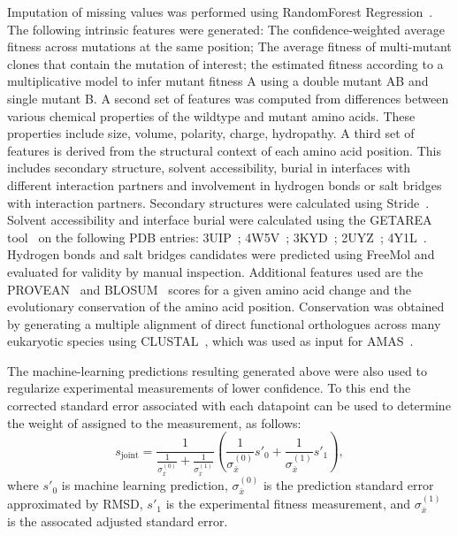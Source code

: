 Imputation of missing values was performed using RandomForest Regression~\cite{breiman_random_2001}. The following intrinsic features were generated: The confidence-weighted average fitness across mutations at the same position; The average fitness of multi-mutant clones that contain the mutation of interest; the estimated fitness according to a multiplicative model to infer mutant fitness A using a double mutant AB and single mutant B.
A second set of features was computed from differences between various chemical properties of the wildtype and mutant amino acids. These properties include size, volume, polarity, charge, hydropathy.
A third set of features is derived from the structural context of each amino acid position. This includes secondary structure, solvent accessibility, burial in interfaces with different interaction partners and involvement in hydrogen bonds or salt bridges with interaction partners. Secondary structures were calculated using Stride~\cite{frishman_knowledge-based_1995}. Solvent accessibility and interface burial were calculated using the GETAREA tool~\cite{fraczkiewicz_exact_1998} on the following PDB entries: 3UIP~\cite{gareau_determinants_2012}; 4W5V~\cite{reiter_characterization_2016}; 3KYD~\cite{olsen_active_2010}; 2UYZ~\cite{knipscheer_noncovalent_2007}; 4Y1L~\cite{alontaga_rwd_2015}. Hydrogen bonds and salt bridges candidates were predicted using FreeMol and evaluated for validity by manual inspection.
Additional features used are the PROVEAN~\cite{choi_predicting_2012} and BLOSUM~\cite{henikoff_amino_1992} scores for a given amino acid change and the evolutionary conservation of the amino acid position. Conservation was obtained by generating a multiple alignment of direct functional orthologues across many eukaryotic species using CLUSTAL~\cite{russell_clustal_2014}, which was used as input for AMAS~\cite{livingstone_protein_1993}.

The machine-learning predictions resulting generated above were also used to regularize experimental measurements of lower confidence. To this end the corrected standard error associated with each datapoint can be used to determine the weight of assigned to the measurement, as follows:
$$s_\text{joint} = \frac{1}{\frac{1}{\sigma_{\bar x}^{(0)}}+\frac{1}{\sigma_{\bar x}^{(1)}}}(\frac{1}{\sigma_{\bar x}^{(0)}} s'_0 + \frac{1}{\sigma_{\bar x}^{(1)}}s'_1),$$
where $s'_0$ is machine learning prediction, $\sigma_{\bar x}^{(0)}$ is the prediction standard error approximated by RMSD, $s'_1$ is the experimental fitness measurement, and $\sigma_{\bar x}^{(1)}$ is the assocated adjusted standard error.


